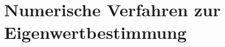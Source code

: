 %
%
%
\section{Numerische Verfahren zur Eigenwertbestimmung
\label{buch:section:numerische-verfahren-eigenwerte}}

